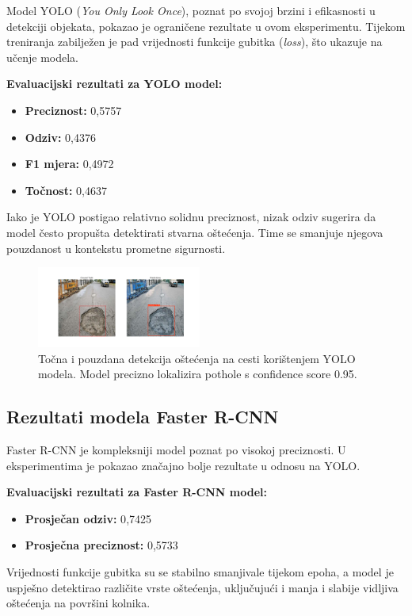 \documentclass[conference]{IEEEtran}
\begin{document}
Model YOLO (\textit{You Only Look Once}), poznat po svojoj brzini i efikasnosti u detekciji objekata, pokazao je ograničene rezultate u ovom eksperimentu. Tijekom treniranja zabilježen je pad vrijednosti funkcije gubitka (\textit{loss}), što ukazuje na učenje modela.

\textbf{Evaluacijski rezultati za YOLO model:}
\begin{itemize}
  \item \textbf{Preciznost:} 0{,}5757
  \item \textbf{Odziv:} 0{,}4376
  \item \textbf{F1 mjera:} 0{,}4972
  \item \textbf{Točnost:} 0{,}4637
\end{itemize}

Iako je YOLO postigao relativno solidnu preciznost, nizak odziv sugerira da model često propušta detektirati stvarna oštećenja. Time se smanjuje njegova pouzdanost u kontekstu prometne sigurnosti.

\begin{figure}[htbp]
\centerline{\includegraphics[width=0.48\textwidth]{Images/YOLOPic.png}}
\caption{Točna i pouzdana detekcija oštećenja na cesti korištenjem YOLO modela. Model precizno lokalizira pothole s confidence score 0.95.}
\label{fig:yolo_eval}
\end{figure}

\subsection{Rezultati modela Faster R-CNN}

Faster R-CNN je kompleksniji model poznat po visokoj preciznosti. U eksperimentima je pokazao značajno bolje rezultate u odnosu na YOLO.

\textbf{Evaluacijski rezultati za Faster R-CNN model:}
\begin{itemize}
  \item \textbf{Prosječan odziv:} 0{,}7425
  \item \textbf{Prosječna preciznost:} 0{,}5733
\end{itemize}

Vrijednosti funkcije gubitka su se stabilno smanjivale tijekom epoha, a model je uspješno detektirao različite vrste oštećenja, uključujući i manja i slabije vidljiva oštećenja na površini kolnika.
\end{document}
